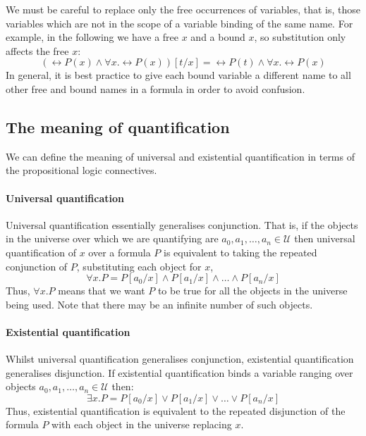We must be careful to replace only the free
occurrences of variables, that is, those variables which are not in
the scope of a variable binding of the same name. For example, in the
following we have a free $x$ and a bound $x$, so substitution only
affects the free $x$:
%
\begin{equation*}
(\rel{P}(x) \wedge \forall x . \rel{P}(x))[t/x]
= \rel{P}(t) \wedge \forall x . \rel{P}(x)
\end{equation*}
%
In general, it is best practice to give each bound variable a different name
to all other free and bound names in a formula in order to avoid
confusion.

\subsection{The meaning of quantification}
\label{subsec:quantifier-meaning}

We can define the meaning of universal and existential quantification
in terms of the propositional logic connectives.

\paragraph{Universal quantification}

Universal quantification essentially generalises conjunction.  That
is, if the objects in the universe over which we are quantifying are
$a_0, a_1, \ldots, a_n \in \mathcal{U}$ then universal quantification
of $x$ over a formula $P$ is equivalent to taking the repeated
conjunction of $P$, substituting each object for $x$, \ie{}
%
\begin{equation}
\forall x . P = P[a_0/x] \wedge P[a_1/x] \wedge
\ldots \wedge P[a_{n}/x]
\label{eq:forall-meaning}
\end{equation}
%
Thus, $\forall x . P$ means that we want $P$ to be true for
all the objects in the universe being used.
Note that there may be an infinite number of such objects.

\paragraph{Existential quantification}

Whilst universal quantification generalises conjunction,
existential quantification generalises disjunction.
If existential quantification binds a variable ranging
over objects $a_0, a_1, \ldots, a_n \in \mathcal{U}$ then:
%
\begin{equation}
\exists x . P = P[a_0/x] \vee P[a_1/x] \vee
\ldots \vee P[a_{n}/x]
\label{eq:exists-meaning}
\end{equation}
%
Thus, existential quantification is equivalent to the repeated
disjunction of the formula $P$ with each object in the universe
replacing $x$.



